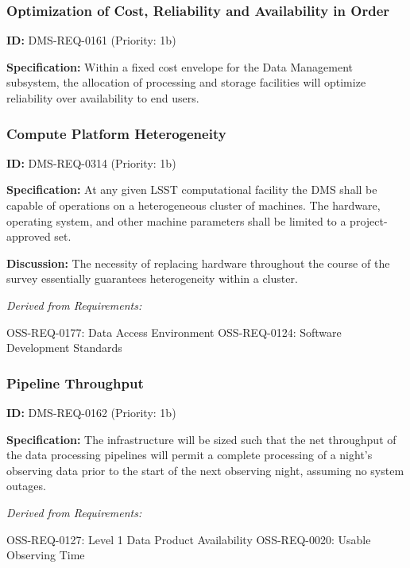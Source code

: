 \documentclass[SE,toc,lsstdraft]{lsstdoc}
\begin{document}
\subsubsection{Optimization of Cost, Reliability and Availability in Order}

\label{DMS-REQ-0161}
\textbf{ID:} DMS-REQ-0161 (Priority: 1b)

\textbf{Specification:} Within a fixed cost envelope for the Data Management subsystem, the allocation of processing and storage facilities will optimize reliability over availability to end users.

\subsubsection{Compute Platform Heterogeneity}

\label{DMS-REQ-0314}
\textbf{ID:} DMS-REQ-0314 (Priority: 1b)

\textbf{Specification:} At any given LSST computational facility the DMS shall be capable of operations on a heterogeneous cluster of machines. The hardware, operating system, and other machine parameters shall be limited to a project-approved set.

\textbf{Discussion: }The necessity of replacing hardware throughout the course of the survey essentially guarantees heterogeneity within a cluster.

\emph{Derived from Requirements:}

OSS-REQ-0177:
Data Access Environment \newline
OSS-REQ-0124:
Software Development Standards \newline

\subsubsection{Pipeline Throughput}

\label{DMS-REQ-0162}
\textbf{ID:} DMS-REQ-0162 (Priority: 1b)

\textbf{Specification:} The infrastructure will be sized such that the net throughput of the data processing pipelines will permit a complete processing of a night’s observing data prior to the start of the next observing night, assuming no system outages.

\emph{Derived from Requirements:}

OSS-REQ-0127:
Level 1 Data Product Availability \newline
OSS-REQ-0020:
Usable Observing Time \newline
\end{document}
